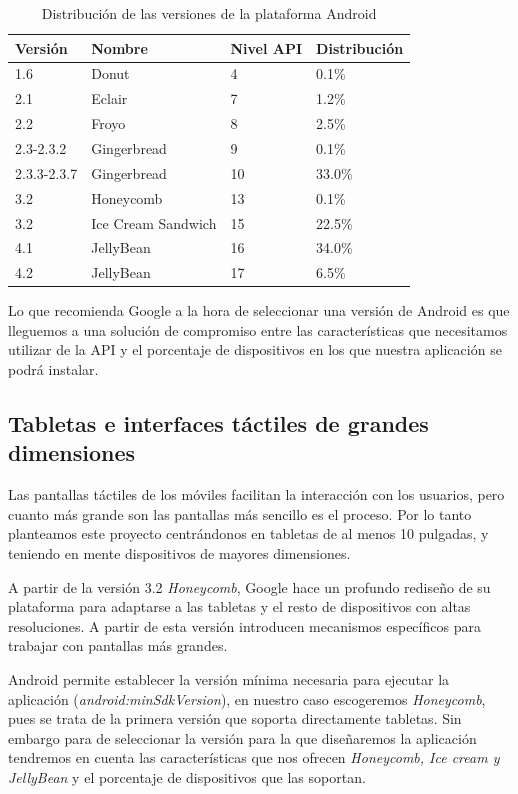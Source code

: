 \begin{table}
\begin{center}

  
  \begin{tabular}{ |l|l|l|l| }
    \hline
    \rowcolor{RubineRed} {\color{White} Versión} & {\color{White} Nombre }& {\color{White} Nivel API }& {\color{White} Distribución} \\ \hline
    1.6 & Donut & 4 & 0.1\%  \\ \hline
    2.1 & Eclair & 7 & 1.2\%  \\ \hline
    2.2 & Froyo & 8 & 2.5\%  \\ \hline
    2.3-2.3.2 & Gingerbread & 9 & 0.1\%  \\ \hline
    2.3.3-2.3.7 & Gingerbread & 10 & 33.0\%  \\ \hline
    3.2 & Honeycomb & 13 & 0.1\%  \\ \hline
    3.2 & Ice Cream Sandwich & 15 & 22.5\%  \\ \hline
    4.1 & JellyBean & 16 & 34.0\%  \\ \hline
    4.2 & JellyBean & 17 & 6.5\%  \\ \hline
    
    \end{tabular}
\end{center}
\caption{Distribución de las versiones de la plataforma Android}
  \label{android:distro}
\end{table}

Lo que recomienda Google a la hora de seleccionar una versión de Android es que lleguemos a una solución de compromiso entre las características que necesitamos utilizar de la API y el porcentaje de dispositivos en los que nuestra aplicación se podrá instalar.\par

\subsection{Tabletas e interfaces táctiles de grandes dimensiones}
Las pantallas táctiles de los móviles facilitan la interacción con los usuarios, pero cuanto más grande son las pantallas más sencillo es el proceso. Por lo tanto planteamos este proyecto centrándonos en tabletas de al menos 10 pulgadas, y teniendo en mente dispositivos de mayores dimensiones.\medskip\par
A partir de la versión 3.2 \emph{Honeycomb}, Google hace un profundo rediseño de su plataforma para adaptarse a las tabletas y el resto de dispositivos con altas resoluciones. A partir de esta versión introducen mecanismos específicos para trabajar con pantallas más grandes.\par
Android permite establecer la versión mínima necesaria para ejecutar la aplicación (\emph{android:minSdkVersion}), en nuestro caso escogeremos \emph{Honeycomb}, pues se trata de la primera versión que soporta directamente tabletas. Sin embargo para de seleccionar la versión para la que diseñaremos la aplicación tendremos en cuenta las características que nos ofrecen \emph{Honeycomb, Ice cream y JellyBean} y el porcentaje de dispositivos que las soportan.\par

